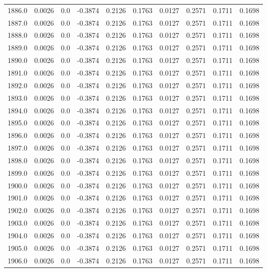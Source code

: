 \begin{longtable}{lrrrrrrrrr}
1886.0 & 0.0026 & 0.0 & -0.3874 & 0.2126 & 0.1763 & 0.0127 & 0.2571 & 0.1711 & 0.1698 \\
1887.0 & 0.0026 & 0.0 & -0.3874 & 0.2126 & 0.1763 & 0.0127 & 0.2571 & 0.1711 & 0.1698 \\
1888.0 & 0.0026 & 0.0 & -0.3874 & 0.2126 & 0.1763 & 0.0127 & 0.2571 & 0.1711 & 0.1698 \\
1889.0 & 0.0026 & 0.0 & -0.3874 & 0.2126 & 0.1763 & 0.0127 & 0.2571 & 0.1711 & 0.1698 \\
1890.0 & 0.0026 & 0.0 & -0.3874 & 0.2126 & 0.1763 & 0.0127 & 0.2571 & 0.1711 & 0.1698 \\
1891.0 & 0.0026 & 0.0 & -0.3874 & 0.2126 & 0.1763 & 0.0127 & 0.2571 & 0.1711 & 0.1698 \\
1892.0 & 0.0026 & 0.0 & -0.3874 & 0.2126 & 0.1763 & 0.0127 & 0.2571 & 0.1711 & 0.1698 \\
1893.0 & 0.0026 & 0.0 & -0.3874 & 0.2126 & 0.1763 & 0.0127 & 0.2571 & 0.1711 & 0.1698 \\
1894.0 & 0.0026 & 0.0 & -0.3874 & 0.2126 & 0.1763 & 0.0127 & 0.2571 & 0.1711 & 0.1698 \\
1895.0 & 0.0026 & 0.0 & -0.3874 & 0.2126 & 0.1763 & 0.0127 & 0.2571 & 0.1711 & 0.1698 \\
1896.0 & 0.0026 & 0.0 & -0.3874 & 0.2126 & 0.1763 & 0.0127 & 0.2571 & 0.1711 & 0.1698 \\
1897.0 & 0.0026 & 0.0 & -0.3874 & 0.2126 & 0.1763 & 0.0127 & 0.2571 & 0.1711 & 0.1698 \\
1898.0 & 0.0026 & 0.0 & -0.3874 & 0.2126 & 0.1763 & 0.0127 & 0.2571 & 0.1711 & 0.1698 \\
1899.0 & 0.0026 & 0.0 & -0.3874 & 0.2126 & 0.1763 & 0.0127 & 0.2571 & 0.1711 & 0.1698 \\
1900.0 & 0.0026 & 0.0 & -0.3874 & 0.2126 & 0.1763 & 0.0127 & 0.2571 & 0.1711 & 0.1698 \\
1901.0 & 0.0026 & 0.0 & -0.3874 & 0.2126 & 0.1763 & 0.0127 & 0.2571 & 0.1711 & 0.1698 \\
1902.0 & 0.0026 & 0.0 & -0.3874 & 0.2126 & 0.1763 & 0.0127 & 0.2571 & 0.1711 & 0.1698 \\
1903.0 & 0.0026 & 0.0 & -0.3874 & 0.2126 & 0.1763 & 0.0127 & 0.2571 & 0.1711 & 0.1698 \\
1904.0 & 0.0026 & 0.0 & -0.3874 & 0.2126 & 0.1763 & 0.0127 & 0.2571 & 0.1711 & 0.1698 \\
1905.0 & 0.0026 & 0.0 & -0.3874 & 0.2126 & 0.1763 & 0.0127 & 0.2571 & 0.1711 & 0.1698 \\
1906.0 & 0.0026 & 0.0 & -0.3874 & 0.2126 & 0.1763 & 0.0127 & 0.2571 & 0.1711 & 0.1698 \\

\end{longtable}
